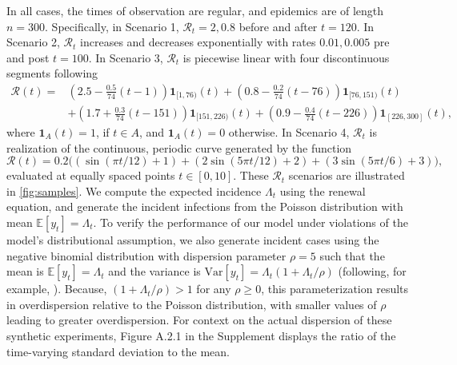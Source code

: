 \documentclass[10pt,letterpaper]{article}
\newcommand{\lr}[1]{\left(#1\right)}
\def\bbE{\mathbb{E}}
\def\calR{\mathcal{R}}
\begin{document}
In all cases, the times of observation are regular, and epidemics are of
length $n=300$. Specifically, in Scenario 1, $\calR_t = 2, 0.8$ before and after
$t=120$. In Scenario 2, $\calR_t$ increases and decreases exponentially with
rates $0.01, 0.005$ pre and post $t=100$. 
In Scenario 3, $\calR_t$ is piecewise linear with four discontinuous segments following 
\begin{equation}
  \begin{split}
    \calR(t) =& \lr{2.5 - \frac{0.5}{74}\lr{t-1}} \boldsymbol{1}_{[1,76)}(t)
     + \lr{0.8 - \frac{0.2}{74}\lr{t-76}} \boldsymbol{1}_{[76,151)}(t) \\
    & + \lr{1.7 + \frac{0.3}{74}\lr{t-151}} \boldsymbol{1}_{[151,226)}(t)
       + \lr{0.9 - \frac{0.4}{74}\lr{t-226}} \boldsymbol{1}_{[226,300]}(t),
  \end{split}
\end{equation}
where $\boldsymbol{1}_{A}(t) = 1$, if $t\in A$, and $\boldsymbol{1}_{A}(t)=0$ otherwise. 
In Scenario 4, $\calR_t$ is realization of the 
continuous, periodic curve generated by the function 
\begin{equation}
  \calR(t) = 0.2 \big(\lr{\sin(\pi t/12) + 1} + \lr{2 \sin\lr{5 \pi t / 12} + 2} 
  + \lr{3 \sin(5\pi t / 6) + 3}\big),
\end{equation} 
evaluated at equally spaced points $t\in [0,10]$. These $\calR_t$ scenarios are
illustrated in \autoref{fig:samples}. We compute the expected incidence
$\Lambda_t$ using the renewal equation, and generate the incident infections
from the Poisson distribution with mean $\bbE[y_t] = \Lambda_t$. To verify the
performance of our model under violations of the model's distributional
assumption, we also generate incident cases using the negative binomial
distribution with dispersion parameter $\rho = 5$ such that the mean is $\bbE[y_t]
= \Lambda_t$ and the variance is $\textrm{Var}[y_t] = \Lambda_t(1 + \Lambda_t /
\rho)$ (following, for example, \cite{gressani2022epilps}). Because, $(1 +
\Lambda_t / \rho)> 1$ for any $\rho \geq 0$, this parameterization
results in overdispersion relative to the Poisson distribution, with smaller
values of $\rho$ leading to greater overdispersion. For context on the actual
dispersion of these synthetic experiments, Figure A.2.1 in the Supplement
displays the ratio of the time-varying standard deviation to the mean. 
\end{document}
